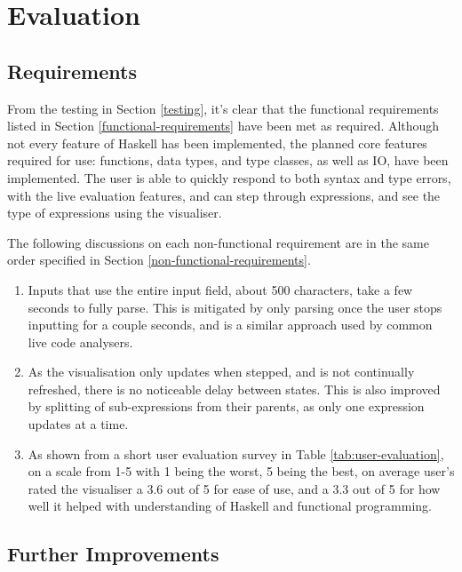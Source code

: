 \section{Evaluation} \label{evaluation}

\subsection{Requirements}
From the testing in Section \ref{testing}, it's clear that the functional requirements listed in Section \ref{functional-requirements} have been met as required. Although not every feature of Haskell has been implemented, the planned core features required for use: functions, data types, and type classes, as well as IO, have been implemented. The user is able to quickly respond to both syntax and type errors, with the live evaluation features, and can step through expressions, and see the type of expressions using the visualiser.

The following discussions on each non-functional requirement are in the same order specified in Section \ref{non-functional-requirements}.
\begin{enumerate}
    \item Inputs that use the entire input field, about 500 characters, take a few seconds to fully parse. This is mitigated by only parsing once the user stops inputting for a couple seconds, and is a similar approach used by common live code analysers.
    \item As the visualisation only updates when stepped, and is not continually refreshed, there is no noticeable delay between states. This is also improved by splitting of sub-expressions from their parents, as only one expression updates at a time.
    \item As shown from a short user evaluation survey in Table \ref{tab:user-evaluation}, on a scale from 1-5 with 1 being the worst, 5 being the best, on average user's rated the visualiser a 3.6 out of 5 for ease of use, and  a 3.3 out of 5 for how well it helped with understanding of Haskell and functional programming.
\end{enumerate}

\subsection{Further Improvements}

